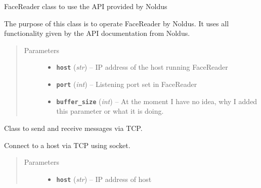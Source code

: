 \documentclass[letterpaper,10pt,english]{sphinxmanual}
\begin{document}
\begin{fulllineitems}
\label{_static/facereader:FaceReader.FaceReader}
FaceReader class to use the API provided by Noldus

The purpose of this class is to operate FaceReader by Noldus. It uses all functionality given by the API documentation from Noldus.
\begin{quote}\begin{description}
\item[{Parameters}] \leavevmode\begin{itemize}
\item {} 
\textbf{\texttt{host}} (\emph{str}) -- IP address of the host running FaceReader

\item {} 
\textbf{\texttt{port}} (\emph{int}) -- Listening port set in FaceReader

\item {} 
\textbf{\texttt{buffer\_size}} (\emph{int}) -- At the moment I have no idea, why I added this parameter or what it is doing.

\end{itemize}

\end{description}\end{quote}

\begin{fulllineitems}
\label{_static/facereader:FaceReader.FaceReader.MySocket}
Class to send and receive messages via TCP.

\begin{fulllineitems}
\label{_static/facereader:FaceReader.FaceReader.MySocket.connect}
Connect to a host via TCP using socket.
\begin{quote}\begin{description}
\item[{Parameters}] \leavevmode\begin{itemize}
\item {} 
\textbf{\texttt{host}} (\emph{str}) -- IP address of host


\end{itemize}
\end{description}
\end{quote}
\end{fulllineitems}
\end{fulllineitems}
\end{fulllineitems}
\end{document}
